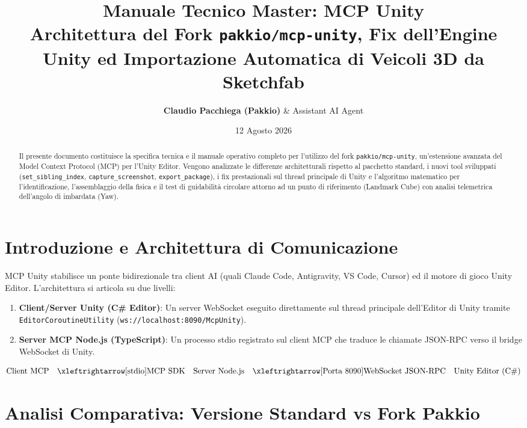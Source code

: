 \documentclass[11pt,a4paper]{article}
\title{\textbf{\Huge Manuale Tecnico Master: MCP Unity}\\[0.3em]
\Large Architettura del Fork \texttt{pakkio/mcp-unity}, Fix dell'Engine Unity ed Importazione Automatica di Veicoli 3D da Sketchfab}
\author{\textbf{Claudio Pacchiega (Pakkio)} \& Assistant AI Agent}
\date{12 Agosto 2026}
\begin{document}
\maketitle

\begin{abstract}
Il presente documento costituisce la specifica tecnica e il manuale operativo completo per l'utilizzo del fork \texttt{pakkio/mcp-unity}, un'estensione avanzata del Model Context Protocol (MCP) per l'Unity Editor. Vengono analizzate le differenze architetturali rispetto al pacchetto standard, i nuovi tool sviluppati (\texttt{set\_sibling\_index}, \texttt{capture\_screenshot}, \texttt{export\_package}), i fix prestazionali sul thread principale di Unity e l'algoritmo matematico per l'identificazione, l'assemblaggio della fisica e il test di guidabilità circolare attorno ad un punto di riferimento (Landmark Cube) con analisi telemetrica dell'angolo di imbardata (Yaw).
\end{abstract}

\tableofcontents
\newpage

\section{Introduzione e Architettura di Comunicazione}

MCP Unity stabilisce un ponte bidirezionale tra client AI (quali Claude Code, Antigravity, VS Code, Cursor) ed il motore di gioco Unity Editor. L'architettura si articola su due livelli:

\begin{enumerate}
    \item \textbf{Client/Server Unity (C\# Editor)}: Un server WebSocket eseguito direttamente sul thread principale dell'Editor di Unity tramite \texttt{EditorCoroutineUtility} (\texttt{ws://localhost:8090/McpUnity}).
    \item \textbf{Server MCP Node.js (TypeScript)}: Un processo stdio registrato sul client MCP che traduce le chiamate JSON-RPC verso il bridge WebSocket di Unity.
\end{enumerate}

\begin{equation}
\text{Client MCP} \quad \xleftrightarrow[\text{stdio}]{\text{MCP SDK}} \quad \text{Server Node.js} \quad \xleftrightarrow[\text{Porta 8090}]{\text{WebSocket JSON-RPC}} \quad \text{Unity Editor (C\#)}
\end{equation}

\section{Analisi Comparativa: Versione Standard vs Fork Pakkio}
\end{document}
